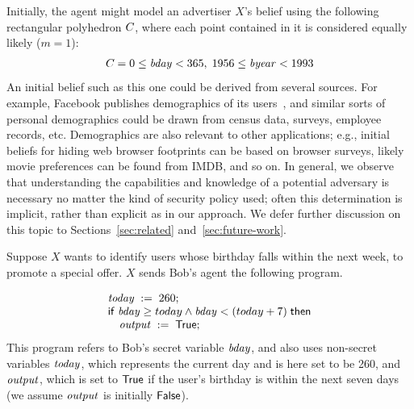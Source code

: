 Initially, the agent might model an advertiser $X$'s belief using the
following rectangular polyhedron $C_{}$, where each point
contained in it is considered equally likely ($m = 1$):
$$
\begin{array}{l}
C_{} = 0 \leq \mathit{bday} < 365,\; 1956 \leq \mathit{byear} < 1993
\end{array}
$$
An initial belief such as this one could be derived from several
sources.  For example, Facebook publishes demographics of its
users~\cite{facebook-demographics}, and similar sorts of personal
demographics could be drawn from census data, surveys, employee
records, etc.  Demographics are also relevant to other applications;
e.g., initial beliefs for hiding web browser footprints can be based
on browser surveys, likely movie preferences can be found from IMDB,
and so on.  In general, we observe that understanding the capabilities
and knowledge of a potential adversary is necessary no matter the kind
of security policy used; often this determination is implicit, rather
than explicit as in our approach.  We defer further discussion on this
topic to Sections~\ref{sec:related} and~\ref{sec:future-work}. 

 Suppose $X$
wants to identify users whose birthday falls within the next week, to
promote a special offer.  $X$ sends Bob's agent the following program.
\begin{example} 
\label{ex:bday}
\begin{displaymath}
\begin{array}{l}
{\ensuremath{\mathit{today}}}\;:=\;{260}; \\
\mathsf{if}\; {\mathit{bday} \geq today \wedge \mathit{bday} < (today+7)}\;\mathsf{then} \\
\quad {\ensuremath{\mathit{output}}}\;:=\;{\mathsf{True}};\\
\end{array}
\end{displaymath}
This program refers to Bob's secret variable $\mathit{bday}$, and also
uses non-secret variables $\mathit{today}$, which represents the current
day and is here set to be 260, and $\mathit{output}$, which is set to
$\mathsf{True}$ if the user's birthday is within the next seven days (we
assume $\mathit{output}$ is initially $\mathsf{False}$).
\end{example}

